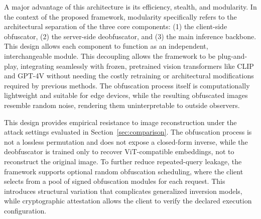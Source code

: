\documentclass{ieeeaccess}
\newcommand{\rev}[1]{{\color{black}#1}}
\begin{document}
A major advantage of this architecture is its efficiency, stealth, and modularity. In the context of the proposed framework, modularity specifically refers to the architectural separation of the three core components: (1) the client-side obfuscator, (2) the server-side deobfuscator, and (3) the main inference backbone. This design allows each component to function as an independent, interchangeable module. This decoupling allows the framework to be plug-and-play, integrating seamlessly with frozen, pretrained vision transformers like CLIP and GPT-4V without needing the costly retraining or architectural modifications required by previous methods. The obfuscation process itself is computationally lightweight and suitable for edge devices, while the resulting obfuscated images resemble random noise, rendering them uninterpretable to outside observers.

\rev{This design provides empirical resistance to image reconstruction under the attack settings evaluated in Section~\ref{sec:comparison}. The obfuscation process is not a lossless permutation and does not expose a closed-form inverse, while the deobfuscator is trained only to recover ViT-compatible embeddings, not to reconstruct the original image. To further reduce repeated-query leakage, the framework supports optional random obfuscation scheduling, where the client selects from a pool of signed obfuscation modules for each request. This introduces structural variation that complicates generalized inversion models, while cryptographic attestation allows the client to verify the declared execution configuration.}


\end{document}
